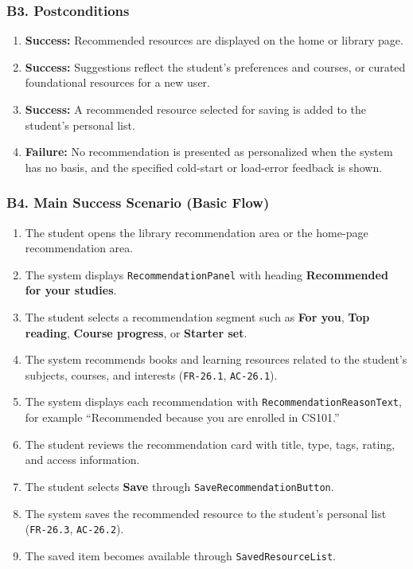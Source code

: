 \documentclass[12pt]{article}
\begin{document}
\hypertarget{sec:b3-postconditions}{}
\subsubsection*{B3. Postconditions}
\par\medskip

\begin{enumerate}
\item \textbf{Success:} Recommended resources are displayed on the home or library page.
\item \textbf{Success:} Suggestions reflect the student's preferences and courses, or curated foundational resources for a new user.
\item \textbf{Success:} A recommended resource selected for saving is added to the student's personal list.
\item \textbf{Failure:} No recommendation is presented as personalized when the system has no basis, and the specified cold-start or load-error feedback is shown.
\end{enumerate}
\par\medskip

\hypertarget{sec:b4-main-success-scenario-basic-flow}{}
\subsubsection*{B4. Main Success Scenario (Basic Flow)}
\par\medskip

\begin{enumerate}
\item The student opens the library recommendation area or the home-page recommendation area.
\item The system displays \texttt{RecommendationPanel} with heading \textbf{Recommended for your studies}.
\item The student selects a recommendation segment such as \textbf{For you}, \textbf{Top reading}, \textbf{Course progress}, or \textbf{Starter set}.
\item The system recommends books and learning resources related to the student's subjects, courses, and interests (\texttt{FR-26.1}, \texttt{AC-26.1}).
\item The system displays each recommendation with \texttt{RecommendationReasonText}, for example “Recommended because you are enrolled in CS101.”
\item The student reviews the recommendation card with title, type, tags, rating, and access information.
\item The student selects \textbf{Save} through \texttt{SaveRecommendationButton}.
\item The system saves the recommended resource to the student's personal list (\texttt{FR-26.3}, \texttt{AC-26.2}).
\item The saved item becomes available through \texttt{SavedResourceList}.
\end{enumerate}
\par\medskip
\end{document}
